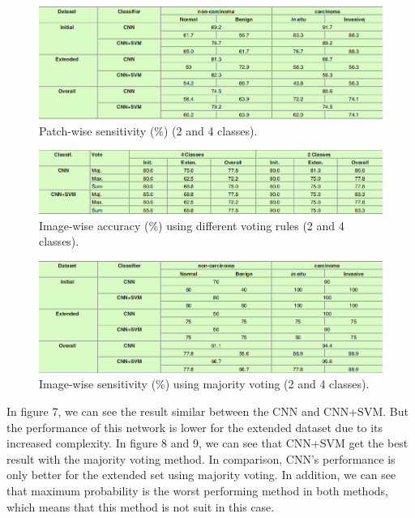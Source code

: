 \documentclass[10pt,twocolumn,letterpaper]{article}
\begin{document}
\begin{figure}[t]
	\begin{center}
		\includegraphics[width=0.8\linewidth]{13}
	\end{center}
	\caption{Patch-wise sensitivity (\%) (2 and 4 classes).} 
	\label{fig:long}
	\label{fig:onecol}
\end{figure}

\begin{figure}[t]
	\begin{center}
		\includegraphics[width=0.8\linewidth]{15}
	\end{center}
	\caption{Image-wise accuracy (\%) using different voting rules (2 and 4 classes).} 
	\label{fig:long}
	\label{fig:onecol}
\end{figure}

\begin{figure}[t]
	\begin{center}
		\includegraphics[width=0.8\linewidth]{14}
	\end{center}
	\caption{Image-wise sensitivity (\%) using majority voting (2 and 4 classes).} 
	\label{fig:long}
	\label{fig:onecol}
\end{figure}

In figure 7, we can see the result similar between the CNN and CNN+SVM. But the performance of this network is lower for the extended dataset due to its increased complexity. In figure 8 and 9, we can see that CNN+SVM get the best result with the majority voting method. In comparison, CNN's performance is only better for the extended set using majority voting. In addition, we can see that maximum probability is the worst performing method in both methods, which means that this method is not suit in this case.
\end{document}
